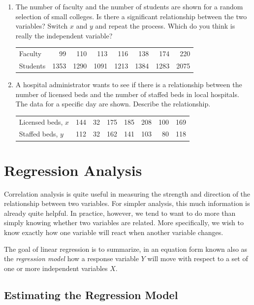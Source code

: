 \documentclass{article}
\begin{document}
\begin{enumerate}
    \item The number of faculty and the number of students are shown for a random selection of small colleges. Is there a significant relationship between the two variables? Switch $x$ and $y$ and repeat the process. Which do you think is really the independent variable?
    \begin{table}[H]
    \begin{tabular}{lrrrrrrr}
    Faculty & 99 & 110 & 113 & 116 & 138 & 174 & 220 \\
    Students & 1353 & 1290 & 1091 & 1213 & 1384 & 1283 & 2075
    \end{tabular}
    \end{table}

    \item A hospital administrator wants to see if there is a relationship between the number of licensed beds and the number of staffed beds in local hospitals. The data for a specific day are shown. Describe the relationship.
    \begin{table}[H]
    \begin{tabular}{lrrrrrrr}
    Licensed beds, $x$ & 144 & 32 & 175 & 185 & 208 & 100 & 169 \\
    Staffed beds, $y$ & 112 & 32 & 162 & 141 & 103 & 80 & 118
    \end{tabular}
    \end{table}

\end{enumerate}

\section{Regression Analysis}

Correlation analysis is quite useful in measuring the strength and direction of the relationship between two variables. For simpler analysis, this much information is already quite helpful. In practice, however, we tend to want to do more than simply knowing whether two variables are related. More specifically, we wish to know exactly how one variable will react when another variable changes.

The goal of linear regression is to summarize, in an equation form known also as the \textit{regression model} how a response variable $Y$ will move with respect to a set of one or more independent variables $X$.

\subsection{Estimating the Regression Model}
\end{document}
